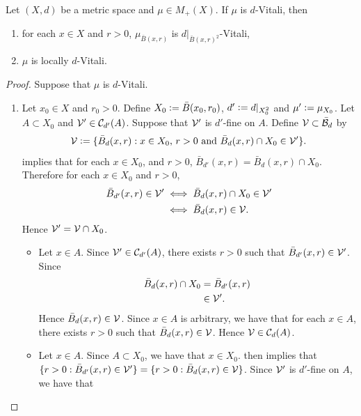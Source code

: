 \documentclass{book}
\begin{document}
	\begin{ex} 
		Let $(X, d)$ be a metric space and $\mu \in M_+(X)$. If $\mu$ is $d$-Vitali, then
		\begin{enumerate}
			\item for each $x \in X$ and $r >0$, $\mu_{\bar{B}(x, r)}$ is $d|_{\bar{B}(x, r)^2}$-Vitali,
			\item $\mu$ is locally $d$-Vitali. 
		\end{enumerate}
		
	\end{ex}
	
	\begin{proof}
		Suppose that $\mu$ is $d$-Vitali. 
		\begin{enumerate}
			\item Let $x_0 \in X$ and $r_0 > 0$. Define $X_0 \vcentcolon= \bar{B}(x_0, r_0)$, $d' \vcentcolon= d|_{X_0^2}$ and $\mu' \vcentcolon= \mu_{X_0}$. Let $A \subset X_0$ and $\mathcal{V}' \in \mathcal{C}_{d'}(A)$. Suppose that $\mathcal{V}'$ is $d'$-fine on $A$. Define $\mathcal{V} \subset \bar{\mathcal{B}}_d$ by 
			$$\mathcal{V} \vcentcolon= \{\bar{B}_d(x, r): \text{$x \in X_0$, $r > 0$ and $\bar{B}_d(x,r) \cap X_0 \in \mathcal{V}'$}\}.$$ 
			 implies that for each $x \in X_0$, and $r>0$, $\bar{B}_{d'}(x, r) = \bar{B}_d(x, r) \cap X_0$. Therefore for each $x \in X_0$ and $r > 0$,
			\begin{align*}
				\bar{B}_{d'}(x, r) \in \mathcal{V}'
				& \iff \bar{B}_d(x, r) \cap X_0 \in \mathcal{V}' \\
				& \iff \bar{B}_d(x, r) \in \mathcal{V}.
			\end{align*}
			Hence $\mathcal{V}' = \mathcal{V} \cap X_0$.
			\begin{itemize}
				\item Let $x \in A$. Since $\mathcal{V}' \in \mathcal{C}_{d'}(A)$, there exists $r >0$ such that $\bar{B}_{d'}(x, r) \in \mathcal{V}'$. Since 
				\begin{align*}
					\bar{B}_d(x, r) \cap X_0   
					& = \bar{B}_{d'}(x, r) \\
					& \in \mathcal{V}'.
				\end{align*}
				Hence $\bar{B}_d(x, r) \in \mathcal{V}$. Since $x \in A$ is arbitrary, we have that for each $x \in A$, there exists $r >0$ such that $\bar{B}_d(x, r) \in \mathcal{V}$. Hence $\mathcal{V} \in \mathcal{C}_d(A)$.
				\item Let $x \in A$. Since $A \subset X_0$, we have that $x \in X_0$.  then implies that $\{r > 0: \bar{B}_{d'}(x, r) \in \mathcal{V}'\} = \{r > 0: \bar{B}_d(x, r) \in \mathcal{V}\}$. Since $\mathcal{V}'$ is $d'$-fine on $A$, we have that

\end{itemize}
\end{enumerate}
\end{proof}
\end{document}
